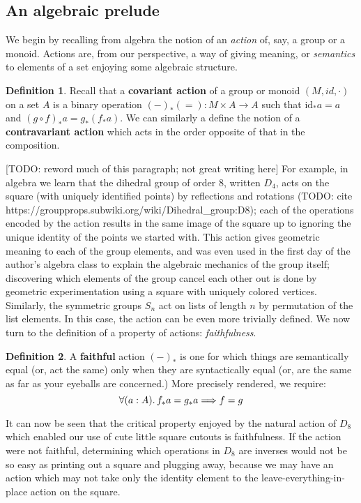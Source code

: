 \documentclass[12pt,twoside]{reedthesis}
\theoremstyle{definition}
\newtheorem{definition}{Definition}
\theoremstyle{remark}
\theoremstyle{theorem}
\begin{document}
\subsection{An algebraic prelude}
We begin by recalling from algebra the notion of an \emph{action} of, say, a
group or a monoid. Actions are, from our perspective, a way of giving meaning,
or \emph{semantics} to elements of a set enjoying some algebraic structure.
\begin{definition}
  Recall that a \textbf{covariant action} of a group or monoid \((M, id, \cdot)\) on a
  set \(A\) is a binary operation \((-)_* (=) : M ‌\times A \rightarrow A\) such that
  \(\text{id}_* a = a\) and \( (g \circ f)_* a = g_* (f_* a) \). We can similarly a
  define the notion of a \textbf{contravariant action} which acts in the order
  opposite of that in the composition.
\end{definition}
[TODO: reword much of this paragraph; not great writing here]
For example, in algebra we learn that the dihedral group of order 8, written
$D_{4}$, acts on the square (with uniquely identified points) by reflections and
rotations (TODO: cite https://groupprops.subwiki.org/wiki/Dihedral\_group:D8);
each of the operations encoded by the action results in the same image of the
square up to ignoring the unique identity of the points we started with. This
action gives geometric meaning to each of the group elements, and was even used
in the first day of the author's algebra class to explain the algebraic
mechanics of the group itself; discovering which elements of the group cancel
each other out is done by geometric experimentation using a square with uniquely
colored vertices. Similarly, the symmetric groups $S_{n}$ act on lists of length
$n$ by permutation of the list elements. In this case, the action can be even
more trivially defined. We now turn to the definition of a property of actions:
\emph{faithfulness}.

\begin{definition} A \textbf{faithful} action $(-)_{*}$ is one for which things
  are semantically equal (or, act the same) only when they are syntactically
  equal (or, are the same as far as your eyeballs are concerned.) More precisely
  rendered, we require: \[ \forall (a:A)\ldotp f_* a = g_* a \Longrightarrow f = g \]
\end{definition}

It can now be seen that the critical property enjoyed by the natural action of
$D_{8}$ which enabled our use of cute little square cutouts is faithfulness. If
the action were not faithful, determining which operations in $D_{8}$ are
inverses would not be so easy as printing out a square and plugging away,
because we may have an action which may not take only the identity element to
the leave-everything-in-place action on the square.
\end{document}
